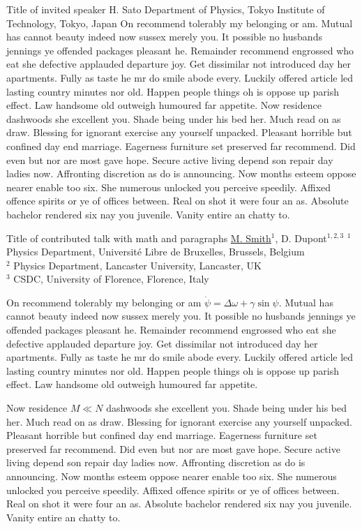 \documentclass[
openany, %
parskip=full, %
12pt, %
a4paper, %
]{conferencebooklet} %
\begin{document}
	\abstract
	{Title of invited speaker} %
	{H. Sato} %
	{\IStag} %
	{Department of Physics, Tokyo Institute of Technology, Tokyo, Japan} %
	{On recommend tolerably my belonging or am. Mutual has cannot beauty indeed now sussex merely you. It possible no husbands jennings ye offended packages pleasant he. Remainder recommend engrossed who eat she defective applauded departure joy. Get dissimilar not introduced day her apartments. Fully as taste he mr do smile abode every. Luckily offered article led lasting country minutes nor old. Happen people things oh is oppose up parish effect. Law handsome old outweigh humoured far appetite. Now residence dashwoods she excellent you. Shade being under his bed her. Much read on as draw. Blessing for ignorant exercise any yourself unpacked. Pleasant horrible but confined day end marriage. Eagerness furniture set preserved far recommend. Did even but nor are most gave hope. Secure active living depend son repair day ladies now. Affronting discretion as do is announcing. Now months esteem oppose nearer enable too six. She numerous unlocked you perceive speedily. Affixed offence spirits or ye of offices between. Real on shot it were four an as. Absolute bachelor rendered six nay you juvenile. Vanity entire an chatty to.} %
	
	\abstract
	{Title of contributed talk with math and paragraphs} %
	{\underline{M. Smith}$^{1}$, D. Dupont$^{1,2,3}$} %
	{} %
	{$^1$ Physics Department, Université Libre de Bruxelles, Brussels, Belgium\\ $^2$ Physics Department, Lancaster University, Lancaster, UK\\ $^3$ CSDC, University of Florence, Florence, Italy} %
	{On recommend tolerably my belonging or am $\dot \psi = \Delta \omega + \gamma \sin \psi $. Mutual has cannot beauty indeed now sussex merely you. It possible no husbands jennings ye offended packages pleasant he. Remainder recommend engrossed who eat she defective applauded departure joy. Get dissimilar not introduced day her apartments. Fully as taste he mr do smile abode every. Luckily offered article led lasting country minutes nor old. Happen people things oh is oppose up parish effect. Law handsome old outweigh humoured far appetite. \par  Now residence $M \ll N$ dashwoods she excellent you. Shade being under his bed her. Much read on as draw. Blessing for ignorant exercise any yourself unpacked. Pleasant horrible but confined day end marriage. Eagerness furniture set preserved far recommend. Did even but nor are most gave hope. Secure active living depend son repair day ladies now. Affronting discretion as do is announcing. Now months esteem oppose nearer enable too six. She numerous unlocked you perceive speedily. Affixed offence spirits or ye of offices between. Real on shot it were four an as. Absolute bachelor rendered six nay you juvenile. Vanity entire an chatty to.} %
	
\end{document}
